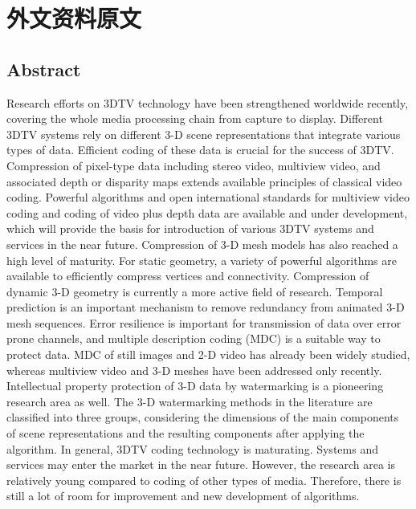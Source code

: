 
\chapter{外文资料原文}
\label{cha:engorg}

\section{Abstract}

Research efforts on 3DTV technology have been strengthened worldwide recently, covering the whole media processing chain from capture to display. Different 3DTV systems rely on different 3-D scene representations that integrate various types of data. Efficient coding of these data is crucial for the success of 3DTV. Compression of pixel-type data including stereo video, multiview video, and associated depth or disparity maps extends available principles of classical video coding. Powerful algorithms and open international standards for multiview video coding and coding of video plus depth data are available and under development, which will provide the basis for introduction of various 3DTV systems and services in the near future. Compression of 3-D mesh models has also reached a high level of maturity. For static geometry, a variety of powerful algorithms are available to efficiently compress vertices and connectivity. Compression of dynamic 3-D geometry is currently a more active field of research. Temporal prediction is an important mechanism to remove redundancy from animated 3-D mesh sequences. Error resilience is important for transmission of data over error prone channels, and multiple description coding (MDC) is a suitable way to protect data. MDC of still images and 2-D video has already been widely studied, whereas multiview video and 3-D meshes have been addressed only recently. Intellectual property protection of 3-D data by watermarking is a pioneering research area as well. The 3-D watermarking methods in the literature are classified into three groups, considering the dimensions of the main components of scene representations and the resulting components after applying the algorithm. In general, 3DTV coding technology is maturating. Systems and services may enter the market in the near future. However, the research area is relatively young compared to coding of other types of media. Therefore, there is still a lot of room for improvement and new development of algorithms.

